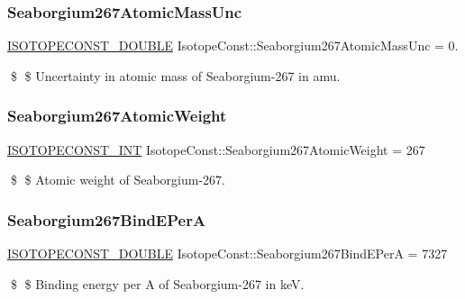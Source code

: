 \subsubsection{\texorpdfstring{Seaborgium267\+Atomic\+Mass\+Unc}{Seaborgium267AtomicMassUnc}}
{\footnotesize\ttfamily \mbox{\hyperlink{group___isotope_const-_macros_ga8f45a7272ce02c0b4c65c44636ed719a}{I\+S\+O\+T\+O\+P\+E\+C\+O\+N\+S\+T\+\_\+\+D\+O\+U\+B\+LE}} Isotope\+Const\+::\+Seaborgium267\+Atomic\+Mass\+Unc = 0.}

\$ \$ Uncertainty in atomic mass of Seaborgium-\/267 in amu. \mbox{\label{group___isotope_const-_seaborgium-_sg267_gab8bd6a50053456628d0f3e07b3778b99}} 
\subsubsection{\texorpdfstring{Seaborgium267\+Atomic\+Weight}{Seaborgium267AtomicWeight}}
{\footnotesize\ttfamily \mbox{\hyperlink{group___isotope_const-_macros_ga5f18360b3e99483a35c32d789e62621c}{I\+S\+O\+T\+O\+P\+E\+C\+O\+N\+S\+T\+\_\+\+I\+NT}} Isotope\+Const\+::\+Seaborgium267\+Atomic\+Weight = 267}

\$ \$ Atomic weight of Seaborgium-\/267. \mbox{\label{group___isotope_const-_seaborgium-_sg267_ga0ea9c74aa8638a7d35d13eb762aa656a}} 
\subsubsection{\texorpdfstring{Seaborgium267\+Bind\+E\+PerA}{Seaborgium267BindEPerA}}
{\footnotesize\ttfamily \mbox{\hyperlink{group___isotope_const-_macros_ga8f45a7272ce02c0b4c65c44636ed719a}{I\+S\+O\+T\+O\+P\+E\+C\+O\+N\+S\+T\+\_\+\+D\+O\+U\+B\+LE}} Isotope\+Const\+::\+Seaborgium267\+Bind\+E\+PerA = 7327}

\$ \$ Binding energy per A of Seaborgium-\/267 in keV. \mbox{\label{group___isotope_const-_seaborgium-_sg267_ga07b68170d449345a3b6e5e8921818abb}} 
